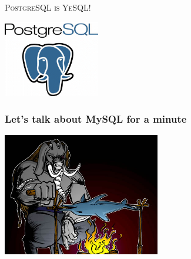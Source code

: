 \documentclass{beamer}
\begin{document}
\begin{frame}
  \begin{center}
    \textsc{\Huge PostgreSQL is YeSQL!}
    \vfill

    \includegraphics[height=9em]{postgres-logo.png}
  \end{center}
\end{frame}

\begin{frame}
  \frametitle{Let's talk about MySQL for a minute}

  
  \begin{center}
    \includegraphics[height=2.1in]{postgresql_versus_mysql.jpg}
  \end{center}
\end{frame}
\end{document}
